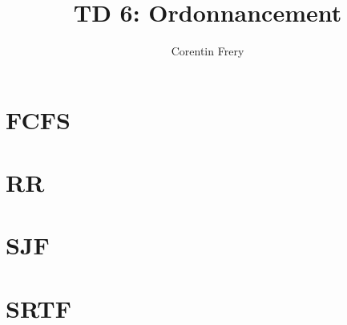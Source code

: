 \documentclass{article}
\author{Corentin Frery}
\title{TD 6: Ordonnancement}
\begin{document}
\maketitle

\section{FCFS}



\section{RR}



\section{SJF}



\section{SRTF}


\end{document}
